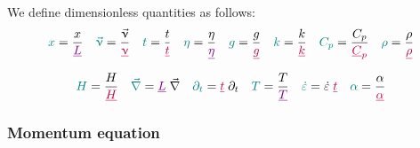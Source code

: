 \documentclass[a4paper,11pt]{article}
\begin{document}
We define {\color{teal}dimensionless} quantities as follows:
\begin{equation}
{\color{teal}x} = \frac{x}{\color{violet}\underline{L}}
\quad
{\color{teal}\vec\upnu} = \frac{\vec\upnu}{\color{purple} \underline{\upnu}}
\quad
{\color{teal}t} = \frac{t}{\color{purple}\underline{t}}
\quad
{\color{teal} \eta} = \frac{\eta}{\color{violet} \underline{\eta}}
\quad
{\color{teal} g} =\frac{g}{\color{purple}\underline{g}}
\quad
{\color{teal} k} = \frac{k}{\color{purple}\underline{k}}
\quad
{\color{teal} C_p} = \frac{C_p}{\color{purple}\underline{C}_p}
\quad
{\color{teal} \rho} =\frac{\rho}{\color{purple}\underline{\rho}}
\end{equation}

\begin{equation}
{\color{teal} H} = \frac{H}{\color{purple}\underline{H}}
\quad
{\color{teal} \vec\nabla} = {\color{violet}\underline{L}}\; \vec\nabla
\quad
{\color{teal} \partial_t} = {\color{purple}\underline{t}}\; \partial_t 
\quad
{\color{teal} T} = \frac{T}{\color{violet}\underline{T}}
\quad
{\color{teal} \dot{\varepsilon}} = \dot{\varepsilon} \; {\color{purple}\underline{t}}
\quad
{\color{teal} \alpha} = \frac{\alpha}{\color{purple} \underline{\alpha}}
\label{eq:physics_adimrels}
\end{equation}

\subsubsection{Momentum equation} 
\end{document}
